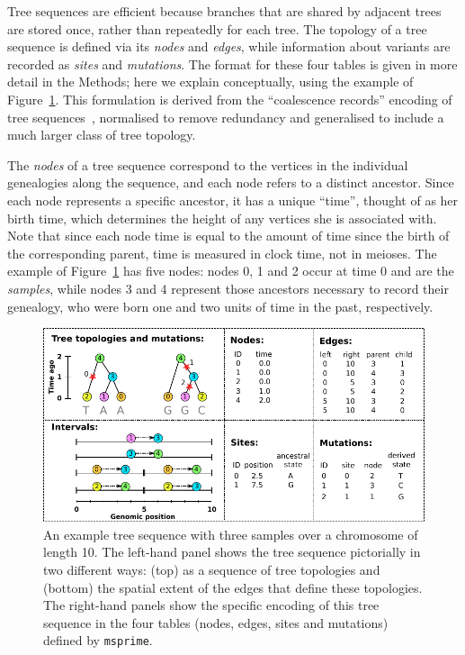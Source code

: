 \documentclass{article}
\newcommand{\msprime}{\texttt{msprime}}
\begin{document}
Tree sequences are efficient because branches that are shared by adjacent trees are stored once,
rather than repeatedly for each tree.
The topology of a tree sequence is defined via its \emph{nodes} and \emph{edges},
while information about variants are recorded as \emph{sites} and \emph{mutations}.
The format for these four tables is given in more detail in the Methods;
here we explain conceptually,
using the example of Figure~\ref{fig:example_tree_sequence}. This formulation
is derived from the ``coalescence records'' encoding of tree
sequences~\citep{kelleher2016efficient}, normalised to remove redundancy
and generalised to include a much larger class of tree topology.

The \emph{nodes} of a tree sequence
correspond to the vertices in the individual genealogies along the sequence,
and each node refers to a distinct ancestor.
Since each node represents a specific ancestor, it has a unique ``time'',
thought of as her birth time, which determines the height of any vertices
she is associated with.
Note that since each node time is equal to the amount of time since the {birth} of the
corresponding parent, time is measured in clock time, not in meioses.
The example of Figure~\ref{fig:example_tree_sequence} has five nodes:
nodes 0, 1 and 2 occur at time 0 and are the \emph{samples},
while nodes 3 and 4 represent those ancestors necessary to record their genealogy,
who were born one and two units of time in the past, respectively.

\begin{figure}
    \begin{center}
        \includegraphics[width=\textwidth]{example_tree_sequence}
    \end{center}
    \caption{
        An example tree sequence with three samples over a chromosome of length 10.
        The left-hand panel shows the tree sequence pictorially in two different ways:
        (top) as a sequence of tree topologies
        and (bottom) the spatial extent of the edges that define these topologies.
        The right-hand panels show the specific encoding
        of this tree sequence in the four tables (nodes, edges, sites and mutations)
        defined by \msprime.
        \label{fig:example_tree_sequence}
    }
\end{figure}
\end{document}
